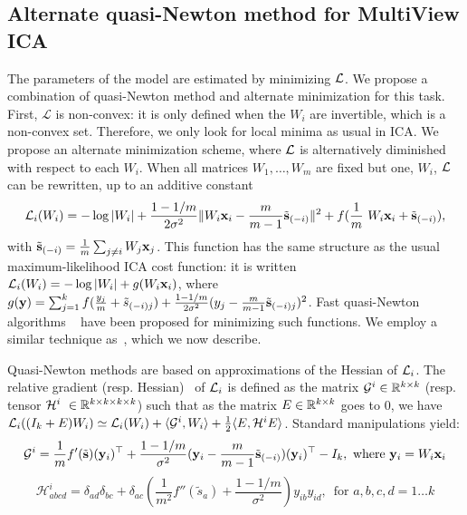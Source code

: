 \documentclass{report}
\begin{document}
\subsection{Alternate quasi-Newton method for MultiView ICA}
%
The parameters of the model are estimated by minimizing $\mathcal{L}$.
%
We propose a combination of quasi-Newton method and alternate minimization for this task.
%
First, $\mathcal{L}$ is non-convex: it is only defined when the $W_i$ are invertible, which is a non-convex set.
%
Therefore, we only look for local minima as usual in ICA.
%
We propose an alternate minimization scheme, where $\mathcal{L}$ is alternatively diminished with respect to each $W_i$. 
%
When all matrices $W_1, \dots, W_m$ are fixed but one, $W_i$, $\mathcal{L}$ can be rewritten, up to an additive constant 
\begin{equation}
    \label{eq:indiv_loss}
  \loss_i(W_i) = -\log|W_i| + \frac{1 - 1/m}{2\sigma^2}\|W_i\xb_i - \frac{m}{m-1}\tilde{\sbb}_{(-i)}\|^2 + f(\frac1m W_i \xb_i +\tilde{\sbb}_{(-i)}), 
\end{equation}
with $\tilde{\mathbf{s}}_{(-i)} = \frac1m \sum_{j \neq i}W_j \mathbf{x}_j$.
%
This function has the same structure as the usual maximum-likelihood ICA cost function: it is written $\mathcal{L}_i(W_i) = -\log|W_i| + g(W_i\mathbf{x}_i)$, where $g(\mathbf{y}) = \sum_{j=1}^kf(\frac{y_j}{m} + \tilde{s}_{(-i)j}) + \frac{1 - 1/m}{2\sigma^2}(y_j - \frac{m}{m-1}\tilde{\mathbf{s}}_{(-i)j})^2$.
%
Fast quasi-Newton algorithms ~\cite{zibulevsky2003blind, ablin2018faster} have been proposed for minimizing such functions.
%
We employ a similar technique as~\cite{zibulevsky2003blind}, which we now describe.

Quasi-Newton methods are based on approximations of the Hessian of $\mathcal{L}_i$.
%
The relative gradient (resp. Hessian)~\cite{amari1996new, cardoso1996equivariant} of $\mathcal{L}_i$ is defined as the matrix $\mathcal{G}^i\in \mathbb{R}^{k \times k}$ (resp. tensor $\mathcal{H}^i \in \bbR^{k\times k\times k\times k}$) such that as the matrix $E\in\mathbb{R}^{k\times k}$ goes to $0$, we have $\mathcal{L}_i((I_k + E)W_i) \simeq \mathcal{L}_i(W_i) + \langle \mathcal{G}^i, W_i\rangle + \frac12\langle E, \mathcal{H}^iE\rangle$. Standard manipulations yield:
\begin{equation}
    \label{eq:gradient}
    \mathcal{G}^i = \frac1mf'(\tilde{\mathbf{s}})(\mathbf{y}_i)^{\top} + \frac{1 - 1 /m}{\sigma^2}(\mathbf{y}_i - \frac{m}{m-1}\tilde{\mathbf{s}}_{(-i)})(\mathbf{y}_i)^{\top} - I_k, \text{ where } \mathbf{y}_i= W_i\mathbf{x}_i
\end{equation}
\begin{equation}
    \label{eq:hessian}
    \mathcal{H}^i_{abcd} = \delta_{ad}\delta_{bc} + \delta_{ac}\left(\frac{1}{m^2}f''(\tilde{s}_a) + \frac{1 - 1/m}{\sigma^2}\right)y_{ib}y_{id},\enspace \text{for }a, b, c, d =1\dots k
\end{equation}
\end{document}
